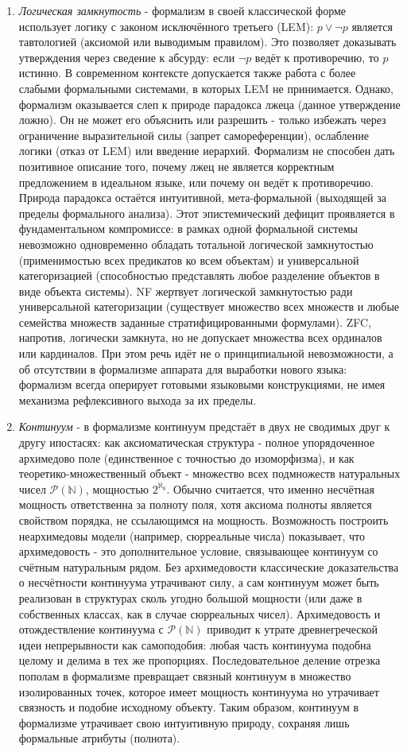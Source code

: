 \documentclass[12pt]{article}
\begin{document}
\begin{enumerate}
    \item {\it Логическая замкнутость} - формализм в своей классической форме использует логику с законом исключённого третьего (LEM): $p \vee \neg p$ является тавтологией (аксиомой или выводимым правилом). Это позволяет доказывать утверждения через сведение к абсурду: если $\neg p$ ведёт к противоречию, то $p$ истинно. В современном контексте допускается также работа с более слабыми формальными системами, в которых LEM не принимается. Однако, формализм оказывается слеп к природе парадокса лжеца (данное утверждение ложно). Он не может его объяснить или разрешить - только избежать через ограничение выразительной силы (запрет самореференции), ослабление логики (отказ от LEM) или введение иерархий. Формализм не способен дать позитивное описание того, почему лжец не является корректным предложением в идеальном языке, или почему он ведёт к противоречию. Природа парадокса остаётся интуитивной, мета-формальной (выходящей за пределы формального анализа). Этот эпистемический дефицит проявляется в фундаментальном компромиссе: в рамках одной формальной системы невозможно одновременно обладать тотальной логической замкнутостью (применимостью всех предикатов ко всем объектам) и универсальной категоризацией (способностью представлять любое разделение объектов в виде объекта системы). NF жертвует логической замкнутостью ради универсальной категоризации (существует множество всех множеств и любые семейства множеств заданные стратифицированными формулами). ZFC, напротив, логически замкнута, но не допускает множества всех ординалов или кардиналов. При этом речь идёт не о принципиальной невозможности, а об отсутствии в формализме аппарата для выработки нового языка: формализм всегда оперирует готовыми языковыми конструкциями, не имея механизма рефлексивного выхода за их пределы.
    \item {\it Континуум} - в формализме континуум предстаёт в двух не сводимых друг к другу ипостасях: как аксиоматическая структура - полное упорядоченное архимедово поле (единственное с точностью до изоморфизма), и как теоретико-множественный объект - множество всех подмножеств натуральных чисел $\mathcal{P}(\mathbb{N})$, мощностью $2^{\aleph_0}$. Обычно считается, что именно несчётная мощность ответственна за полноту поля, хотя аксиома полноты является свойством порядка, не ссылающимся на мощность. Возможность построить неархимедовы модели (например, сюрреальные числа) показывает, что архимедовость - это дополнительное условие, связывающее континуум со счётным натуральным рядом. Без архимедовости классические доказательства о несчётности континуума утрачивают силу, а сам континуум может быть реализован в структурах сколь угодно большой мощности (или даже в собственных классах, как в случае сюрреальных чисел). Архимедовость и отождествление континуума с $\mathcal{P}(\mathbb{N})$ приводит к утрате древнегреческой идеи непрерывности как самоподобия: любая часть континуума подобна целому и делима в тех же пропорциях. Последовательное деление отрезка пополам в формализме превращает связный континуум в множество изолированных точек, которое имеет мощность континуума но утрачивает связность и подобие исходному объекту. Таким образом, континуум в формализме утрачивает свою интуитивную природу, сохраняя лишь формальные атрибуты (полнота).

\end{enumerate}
\end{document}
